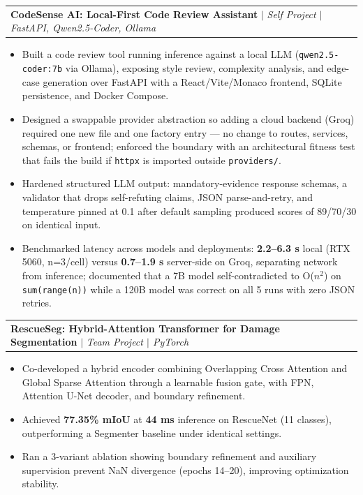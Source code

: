 \documentclass[letterpaper,11pt]{article}
\makeatletter
\newcommand{\resumeItem}[1]{
  \item\small{
    {#1 \vspace{-2pt}}
  }
}
\newcommand{\resumeProjectHeading}[2]{
    \item
    \begin{tabular*}{0.97\textwidth}{l@{\extracolsep{\fill}}r}
      \small#1 & #2 \\
    \end{tabular*}\vspace{-7pt}
}
\newcommand{\resumeItemListStart}{\begin{itemize}[label={\textbullet}]}
\newcommand{\resumeItemListEnd}{\end{itemize}\vspace{-5pt}}
\makeatother
\begin{document}
      \resumeProjectHeading
          {\textbf{CodeSense AI: Local-First Code Review Assistant} $\vert$ \emph{Self Project $\vert$ FastAPI, Qwen2.5-Coder, Ollama}}{}
          \resumeItemListStart
            \resumeItem{Built a code review tool running inference against a local LLM (\texttt{qwen2.5-coder:7b} via Ollama), exposing style review, complexity analysis, and edge-case generation over FastAPI with a React/Vite/Monaco frontend, SQLite persistence, and Docker Compose.}
            \resumeItem{Designed a swappable provider abstraction so adding a cloud backend (Groq) required one new file and one factory entry --- no change to routes, services, schemas, or frontend; enforced the boundary with an architectural fitness test that fails the build if \texttt{httpx} is imported outside \texttt{providers/}.}
            \resumeItem{Hardened structured LLM output: mandatory-evidence response schemas, a validator that drops self-refuting claims, JSON parse-and-retry, and temperature pinned at 0.1 after default sampling produced scores of 89/70/30 on identical input.}
            \resumeItem{Benchmarked latency across models and deployments: \textbf{2.2--6.3 s} local (RTX 5060, n=3/cell) versus \textbf{0.7--1.9 s} server-side on Groq, separating network from inference; documented that a 7B model self-contradicted to O($n^2$) on \texttt{sum(range(n))} while a 120B model was correct on all 5 runs with zero JSON retries.}
          \resumeItemListEnd

      \resumeProjectHeading
          {\textbf{RescueSeg: Hybrid-Attention Transformer for Damage Segmentation} $\vert$ \emph{Team Project $\vert$ PyTorch}}{}
          \resumeItemListStart
            \resumeItem{Co-developed a hybrid encoder combining Overlapping Cross Attention and Global Sparse Attention through a learnable fusion gate, with FPN, Attention U-Net decoder, and boundary refinement.}
            \resumeItem{Achieved \textbf{77.35\% mIoU} at \textbf{44 ms} inference on RescueNet (11 classes), outperforming a Segmenter baseline under identical settings.}
            \resumeItem{Ran a 3-variant ablation showing boundary refinement and auxiliary supervision prevent NaN divergence (epochs 14--20), improving optimization stability.}
          \resumeItemListEnd
\end{document}
